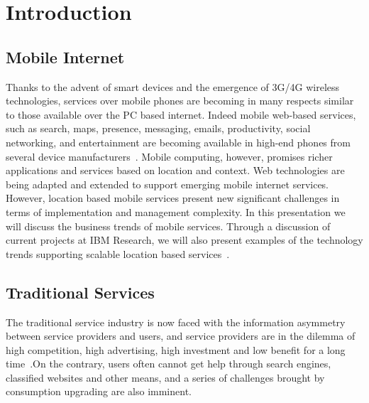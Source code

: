 \documentclass{elsarticle}
\begin{document}
\section{Introduction}\label{sec:intro}

\subsection{Mobile Internet}
Thanks to the advent of smart devices and the emergence of 3G/4G wireless technologies, services over mobile phones are becoming in many respects similar to those available over the PC based internet. Indeed mobile web-based services, such as search, maps, presence, messaging, emails, productivity, social networking, and entertainment are becoming available in high-end phones from several device manufacturers~\cite{hlw3,hlw8}. Mobile computing, however, promises richer applications and services based on location and context. Web technologies are being adapted and extended to support emerging mobile internet services. However, location based mobile services present new significant challenges in terms of implementation and management complexity. In this presentation we will discuss the business trends of mobile services. Through a discussion of current projects at IBM Research, we will also present examples of the technology trends supporting scalable location based services~\cite{MSBTT,MSBTT2,MB}.


\subsection{Traditional Services} 

The traditional service industry is now faced with the information asymmetry between service providers and users, and service providers are in the dilemma of high competition, high advertising, high investment and low benefit for a long time~\cite{hlw,hlw2,hlw7}.On the contrary, users often cannot get help through search engines, classified websites and other means, and a series of challenges brought by consumption upgrading are also imminent.
\end{document}
